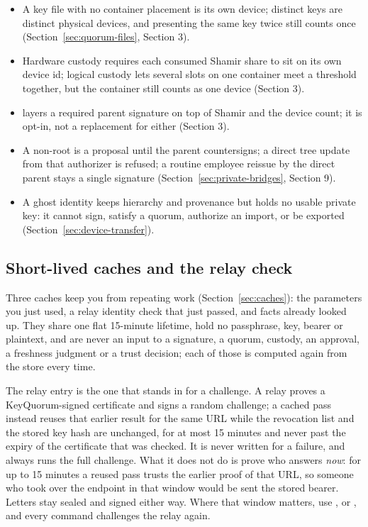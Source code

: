 \begin{itemize}
  \item A key file with no container placement is its own device; distinct
   keys are distinct physical devices, and presenting
  the same key twice still counts once (Section~\ref{sec:quorum-files},
  Section 3).
  \item Hardware custody requires each consumed Shamir share to sit on its
  own device id; logical custody lets several slots on one container meet a
  threshold together, but the container still counts as one device (Section 3).
  \item {} layers a required parent signature
  on top of Shamir and the device count; it is opt-in, not a replacement for
  either (Section 3).
  \item A non-root  is a proposal until the parent
  countersigns; a direct tree update from that authorizer is refused; a
  routine employee reissue by the direct parent stays a single signature
  (Section~\ref{sec:private-bridges}, Section 9).
  \item A ghost identity keeps hierarchy and provenance but holds no usable
  private key: it cannot sign, satisfy a quorum, authorize an import, or be
  exported (Section~\ref{sec:device-transfer}).
\end{itemize}

\subsection{Short-lived caches and the relay check}

Three caches keep you from repeating work (Section~\ref{sec:caches}):
the parameters you just used, a relay identity check that just passed, and
facts  already looked up. They share one flat 15-minute
lifetime, hold no passphrase, key, bearer or plaintext, and are never an input
to a signature, a quorum, custody, an approval, a freshness judgment or a
trust decision; each of those is computed again from the store every time.

The relay entry is the one that stands in for a challenge. A relay proves a
KeyQuorum-signed certificate and signs a random challenge; a cached pass
instead reuses that earlier result for the same URL while the revocation list
and the stored key hash are unchanged, for at most 15 minutes and never past
the expiry of the certificate that was checked. It is never
written for a failure, and  always runs the full challenge.
What it does not do is prove who answers \emph{now}: for up to 15 minutes a
reused pass trusts the earlier proof of that URL, so someone who took over the
endpoint in that window would be sent the stored bearer. Letters stay sealed
and signed either way. Where that window matters, use ,
 or , and every command
challenges the relay again.

